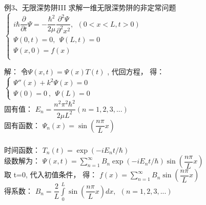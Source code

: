 \begin{frame}
	\frametitle{}
	\begin{exampleblock} {例3、无限深势阱III}
	求解一维无限深势阱的非定常问题 \\
		{ $ \displaystyle 
			\begin{cases}
				i\hbar \dfrac{\partial }{\partial t} \Psi = -\dfrac{\hbar^2}{2\mu } \dfrac{\partial ^2 \Psi }{\partial ^2  x ^2 } , ~~ (0<x<L, t>0) \\
				\Psi (0,t) =0, ~~ \Psi (L,t) =0 \\
				\Psi (x,0) =f(x)  \\
			\end{cases}
		$} \\
	\end{exampleblock}
	\alert{解：} 	令$\Psi (x,t) =\Psi (x) T(t) $ ,  代回方程， 得：\\
	{ $ \displaystyle 
	\begin{cases}
		\Psi''(x) + k^2	\Psi(x)=0  \\
		\Psi(0)=0~,~~ \Psi(L)=0 ~~~~~
	\end{cases}
	$} \\
	固有值： $E_n = \dfrac{n^2\pi^2\hbar^2}{2\mu L^2} (n=1,2,3,...)$\\
	固有函数： $ \Psi_n(x) = \sin(\dfrac{n\pi}{L}x) $ 	 \\ 
\end{frame}

\begin{frame}
	\frametitle{}
	时间函数： $T_n(t)  = \exp(-i E_n t /\hbar) $ \\
	级数解为：  $ \Psi(x,t)  = \sum\limits_{n=1}^{\infty}  B_n \exp(-i E_n t /\hbar)  \sin(\dfrac{n\pi}{L}x)  $ \\
	取 t=0, 代入初值条件， 得：  $ f(x)= \sum\limits_{n=1}^{\infty}  B_n \sin(\dfrac{n\pi}{L}x)  $ \\
	得系数：  $ B_n= \dfrac{2}{L} \int\limits_{0} ^{L}  \sin(\dfrac{n\pi}{L}x) dx, ~~ (n=1,2,3,...) $ \\
\end{frame}

